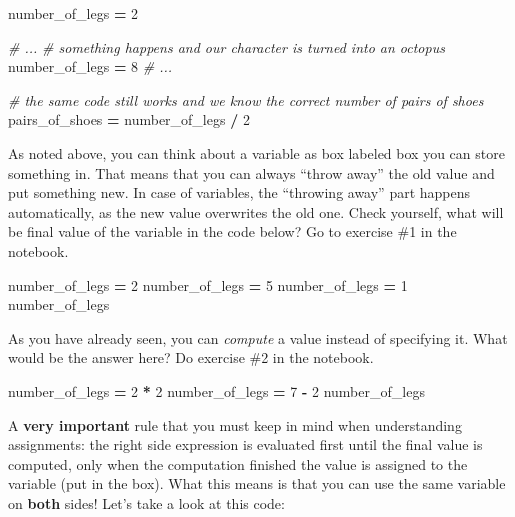 \documentclass[
]{book}
\newenvironment{Shaded}{\begin{snugshade}}{\end{snugshade}}
\newcommand{\CommentTok}[1]{\textcolor[rgb]{0.56,0.35,0.01}{\textit{#1}}}
\newcommand{\DecValTok}[1]{\textcolor[rgb]{0.00,0.00,0.81}{#1}}
\newcommand{\NormalTok}[1]{#1}
\newcommand{\OperatorTok}[1]{\textcolor[rgb]{0.81,0.36,0.00}{\textbf{#1}}}
\begin{document}
\begin{Shaded}
\begin{Highlighting}[]
\NormalTok{number\_of\_legs }\OperatorTok{=} \DecValTok{2}

\CommentTok{\# ...}
\CommentTok{\# something happens and our character is turned into an octopus}
\NormalTok{number\_of\_legs }\OperatorTok{=} \DecValTok{8}
\CommentTok{\# ...}

\CommentTok{\# the same code still works and we know the correct number of pairs of shoes}
\NormalTok{pairs\_of\_shoes }\OperatorTok{=}\NormalTok{ number\_of\_legs }\OperatorTok{/} \DecValTok{2}
\end{Highlighting}
\end{Shaded}

As noted above, you can think about a variable as box labeled box you can store something in. That means that you can always ``throw away'' the old value and put something new. In case of variables, the ``throwing away'' part happens automatically, as the new value overwrites the old one. Check yourself, what will be final value of the variable in the code below? Go to exercise \#1 in the notebook.

\begin{Shaded}
\begin{Highlighting}[]
\NormalTok{number\_of\_legs }\OperatorTok{=} \DecValTok{2}
\NormalTok{number\_of\_legs }\OperatorTok{=} \DecValTok{5}
\NormalTok{number\_of\_legs }\OperatorTok{=} \DecValTok{1}
\NormalTok{number\_of\_legs}
\end{Highlighting}
\end{Shaded}

As you have already seen, you can \emph{compute} a value instead of specifying it. What would be the answer here? Do exercise \#2 in the notebook.

\begin{Shaded}
\begin{Highlighting}[]
\NormalTok{number\_of\_legs }\OperatorTok{=} \DecValTok{2} \OperatorTok{*} \DecValTok{2}
\NormalTok{number\_of\_legs }\OperatorTok{=} \DecValTok{7} \OperatorTok{{-}} \DecValTok{2}
\NormalTok{number\_of\_legs}
\end{Highlighting}
\end{Shaded}

A \textbf{very important} rule that you must keep in mind when understanding assignments: the right side expression is evaluated first until the final value is computed, only when the computation finished the value is assigned to the variable (put in the box). What this means is that you can use the same variable on \textbf{both} sides! Let's take a look at this code:
\end{document}
